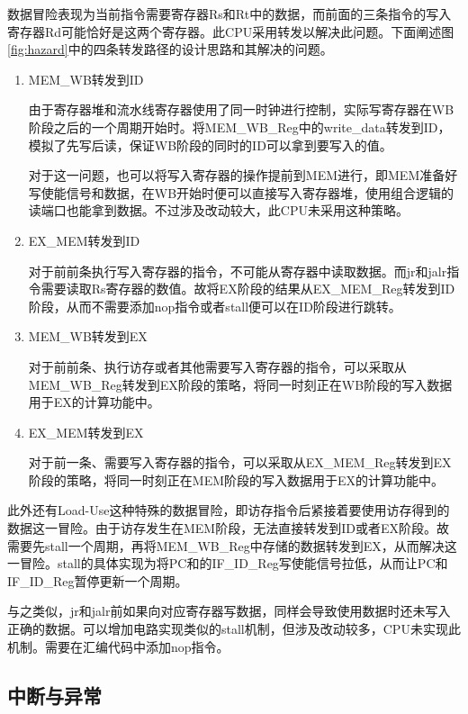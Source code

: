 \documentclass[a4paper]{article}
\begin{document}
数据冒险表现为当前指令需要寄存器Rs和Rt中的数据，而前面的三条指令的写入寄存器Rd可能恰好是这两个寄存器。此CPU采用转发以解决此问题。下面阐述图\ref{fig:hazard}中的四条转发路径的设计思路和其解决的问题。

\begin{enumerate}[1)]
    \item MEM\_WB转发到ID

          由于寄存器堆和流水线寄存器使用了同一时钟进行控制，实际写寄存器在WB阶段之后的一个周期开始时。将MEM\_WB\_Reg中的write\_data转发到ID，模拟了先写后读，保证WB阶段的同时的ID可以拿到要写入的值。

          对于这一问题，也可以将写入寄存器的操作提前到MEM进行，即MEM准备好写使能信号和数据，在WB开始时便可以直接写入寄存器堆，使用组合逻辑的读端口也能拿到数据。不过涉及改动较大，此CPU未采用这种策略。

    \item EX\_MEM转发到ID

          对于前前条执行写入寄存器的指令，不可能从寄存器中读取数据。而jr和jalr指令需要读取Rs寄存器的数值。故将EX阶段的结果从EX\_MEM\_Reg转发到ID阶段，从而不需要添加nop指令或者stall便可以在ID阶段进行跳转。

    \item MEM\_WB转发到EX

          对于前前条、执行访存或者其他需要写入寄存器的指令，可以采取从MEM\_WB\_Reg转发到EX阶段的策略，将同一时刻正在WB阶段的写入数据用于EX的计算功能中。

    \item EX\_MEM转发到EX

          对于前一条、需要写入寄存器的指令，可以采取从EX\_MEM\_Reg转发到EX阶段的策略，将同一时刻正在MEM阶段的写入数据用于EX的计算功能中。
\end{enumerate}

此外还有Load-Use这种特殊的数据冒险，即访存指令后紧接着要使用访存得到的数据这一冒险。由于访存发生在MEM阶段，无法直接转发到ID或者EX阶段。故需要先stall一个周期，再将MEM\_WB\_Reg中存储的数据转发到EX，从而解决这一冒险。stall的具体实现为将PC和的IF\_ID\_Reg写使能信号拉低，从而让PC和IF\_ID\_Reg暂停更新一个周期。

与之类似，jr和jalr前如果向对应寄存器写数据，同样会导致使用数据时还未写入正确的数据。可以增加电路实现类似的stall机制，但涉及改动较多，CPU未实现此机制。需要在汇编代码中添加nop指令。

\subsection{中断与异常\label{sec:intexc}}
\end{document}
